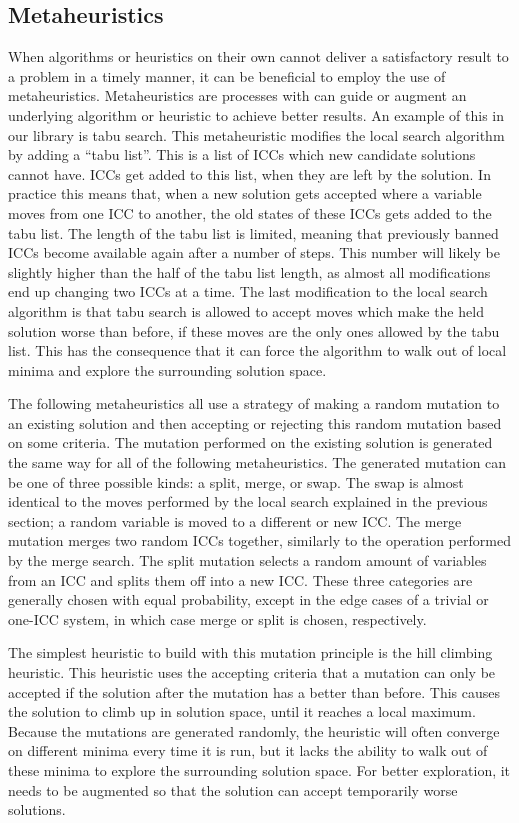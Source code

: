 \subsection{Metaheuristics}
When algorithms or heuristics on their own cannot deliver a satisfactory result to a problem in a timely manner, it can be beneficial to employ the use of metaheuristics. Metaheuristics are processes with can guide or augment an underlying algorithm or heuristic to achieve better results. An example of this in our library is tabu search. This metaheuristic modifies the local search algorithm by adding a ``tabu list''. This is a list of ICCs which new candidate solutions cannot have. ICCs get added to this list, when they are left by the solution. In practice this means that, when a new solution gets accepted where a variable moves from one ICC to another, the old states of these ICCs gets added to the tabu list. The length of the tabu list is limited, meaning that previously banned ICCs become available again after a number of steps. This number will likely be slightly higher than the half of the tabu list length, as almost all modifications end up changing two ICCs at a time. The last modification to the local search algorithm is that tabu search is allowed to accept moves which make the held solution worse than before, if these moves are the only ones allowed by the tabu list. This has the consequence that it can force the algorithm to walk out of local minima and explore the surrounding solution space.

The following metaheuristics all use a strategy of making a random mutation to an existing solution and then accepting or rejecting this random mutation based on some criteria. The mutation performed on the existing solution is generated the same way for all of the following metaheuristics. The generated mutation can be one of three possible kinds: a split, merge, or swap. The swap is almost identical to the moves performed by the local search explained in the previous section; a random variable is moved to a different or new ICC. The merge mutation merges two random ICCs together, similarly to the operation performed by the merge search. The split mutation selects a random amount of variables from an ICC and splits them off into a new ICC. These three categories are generally chosen with equal probability, except in the edge cases of a trivial or one-ICC system, in which case merge or split is chosen, respectively.

The simplest heuristic to build with this mutation principle is the hill climbing heuristic. This heuristic uses the accepting criteria that a mutation can only be accepted if the solution after the mutation has a better \loge{} than before. This causes the solution to climb up in solution space, until it reaches a local maximum. Because the mutations are generated randomly, the heuristic will often converge on different minima every time it is run, but it lacks the ability to walk out of these minima to explore the surrounding solution space. For better exploration, it needs to be augmented so that the solution can accept temporarily worse solutions.


